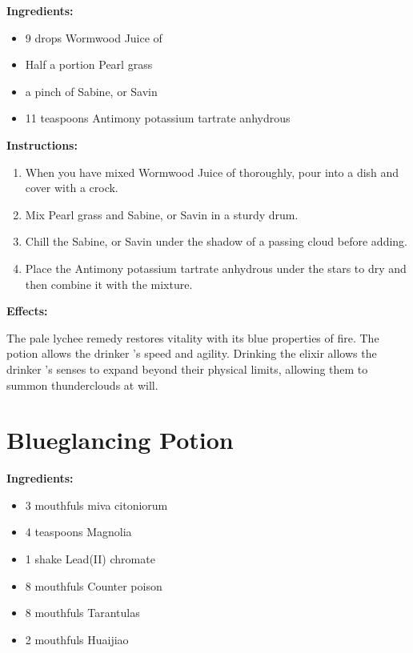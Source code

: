 \documentclass{article}
\begin{document}
\textbf{Ingredients:}

\begin{itemize}
  \item 9 drops Wormwood Juice of
  \item Half a portion Pearl grass
  \item a pinch of Sabine, or Savin
  \item 11 teaspoons Antimony potassium tartrate anhydrous
\end{itemize}

\textbf{Instructions:}

\begin{enumerate}
  \item When you have mixed Wormwood Juice of thoroughly, pour into a dish and cover with a crock.
  \item Mix Pearl grass and Sabine, or Savin in a sturdy drum.
  \item Chill the Sabine, or Savin under the shadow of a passing cloud before adding.
  \item Place the Antimony potassium tartrate anhydrous under the stars to dry and then combine it with the mixture.
\end{enumerate}

\textbf{Effects:}

The pale lychee remedy restores vitality with its blue properties of fire. The potion allows the drinker 's speed and agility. Drinking the elixir allows the drinker 's senses to expand beyond their physical limits, allowing them to summon thunderclouds at will.

\newpage
\section*{Blueglancing Potion}

\textbf{Ingredients:}

\begin{itemize}
  \item 3 mouthfuls miva citoniorum
  \item 4 teaspoons Magnolia
  \item 1 shake Lead(II) chromate
  \item 8 mouthfuls Counter poison
  \item 8 mouthfuls Tarantulas
  \item 2 mouthfuls Huaijiao
\end{itemize}
\end{document}
